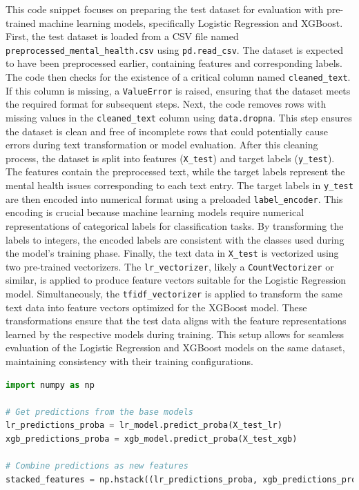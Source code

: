 \noindent
This code snippet focuses on preparing the test dataset for evaluation with pre-trained machine learning models, specifically Logistic Regression and XGBoost. First, the test dataset is loaded from a CSV file named \texttt{preprocessed\_mental\_health.csv} using \texttt{pd.read\_csv}. The dataset is expected to have been preprocessed earlier, containing features and corresponding labels. The code then checks for the existence of a critical column named \texttt{cleaned\_text}. If this column is missing, a \texttt{ValueError} is raised, ensuring that the dataset meets the required format for subsequent steps. Next, the code removes rows with missing values in the \texttt{cleaned\_text} column using \texttt{data.dropna}. This step ensures the dataset is clean and free of incomplete rows that could potentially cause errors during text transformation or model evaluation. After this cleaning process, the dataset is split into features (\texttt{X\_test}) and target labels (\texttt{y\_test}). The features contain the preprocessed text, while the target labels represent the mental health issues corresponding to each text entry. The target labels in \texttt{y\_test} are then encoded into numerical format using a preloaded \texttt{label\_encoder}. This encoding is crucial because machine learning models require numerical representations of categorical labels for classification tasks. By transforming the labels to integers, the encoded labels are consistent with the classes used during the model's training phase. Finally, the text data in \texttt{X\_test} is vectorized using two pre-trained vectorizers. The \texttt{lr\_vectorizer}, likely a \texttt{CountVectorizer} or similar, is applied to produce feature vectors suitable for the Logistic Regression model. Simultaneously, the \texttt{tfidf\_vectorizer} is applied to transform the same text data into feature vectors optimized for the XGBoost model. These transformations ensure that the test data aligns with the feature representations learned by the respective models during training. This setup allows for seamless evaluation of the Logistic Regression and XGBoost models on the same dataset, maintaining consistency with their training configurations.

\begin{tcolorbox}[colback=gray!5!white, colframe=gray!80!black, boxrule=0.5pt, title=Combine Base Model Predictions]
\begin{lstlisting}[language=Python]
import numpy as np

# Get predictions from the base models
lr_predictions_proba = lr_model.predict_proba(X_test_lr)
xgb_predictions_proba = xgb_model.predict_proba(X_test_xgb)

# Combine predictions as new features
stacked_features = np.hstack((lr_predictions_proba, xgb_predictions_proba))
\end{lstlisting}
\end{tcolorbox}

